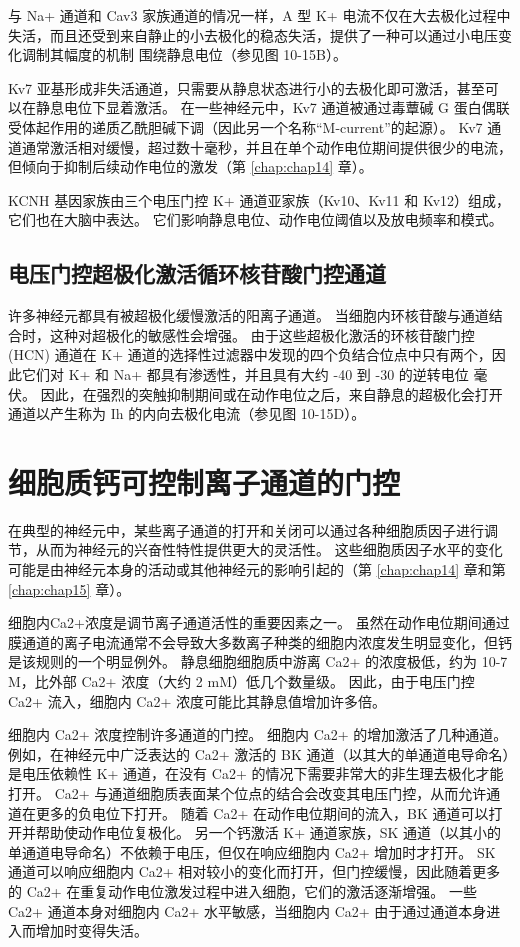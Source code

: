 与 Na+ 通道和 Cav3 家族通道的情况一样，A 型 K+ 电流不仅在大去极化过程中失活，而且还受到来自静止的小去极化的稳态失活，提供了一种可以通过小电压变化调制其幅度的机制 围绕静息电位（参见图 10-15B）。

Kv7 亚基形成非失活通道，只需要从静息状态进行小的去极化即可激活，甚至可以在静息电位下显着激活。 
在一些神经元中，Kv7 通道被通过毒蕈碱 G 蛋白偶联受体起作用的递质乙酰胆碱下调（因此另一个名称“M-current”的起源）。 
Kv7 通道通常激活相对缓慢，超过数十毫秒，并且在单个动作电位期间提供很少的电流，但倾向于抑制后续动作电位的激发（第 \ref{chap:chap14} 章）。

KCNH 基因家族由三个电压门控 K+ 通道亚家族（Kv10、Kv11 和 Kv12）组成，它们也在大脑中表达。 
它们影响静息电位、动作电位阈值以及放电频率和模式。


\subsection{电压门控超极化激活循环核苷酸门控通道}
许多神经元都具有被超极化缓慢激活的阳离子通道。 
当细胞内环核苷酸与通道结合时，这种对超极化的敏感性会增强。 
由于这些超极化激活的环核苷酸门控 (HCN) 通道在 K+ 通道的选择性过滤器中发现的四个负结合位点中只有两个，因此它们对 K+ 和 Na+ 都具有渗透性，并且具有大约 -40 到 -30 的逆转电位 毫伏。 
因此，在强烈的突触抑制期间或在动作电位之后，来自静息的超极化会打开通道以产生称为 Ih 的内向去极化电流（参见图 10-15D）。


\section{细胞质钙可控制离子通道的门控}
在典型的神经元中，某些离子通道的打开和关闭可以通过各种细胞质因子进行调节，从而为神经元的兴奋性特性提供更大的灵活性。 
这些细胞质因子水平的变化可能是由神经元本身的活动或其他神经元的影响引起的（第 \ref{chap:chap14} 章和第 \ref{chap:chap15} 章）。


细胞内Ca2+浓度是调节离子通道活性的重要因素之一。 
虽然在动作电位期间通过膜通道的离子电流通常不会导致大多数离子种类的细胞内浓度发生明显变化，但钙是该规则的一个明显例外。 
静息细胞细胞质中游离 Ca2+ 的浓度极低，约为 10-7 M，比外部 Ca2+ 浓度（大约 2 mM）低几个数量级。 
因此，由于电压门控 Ca2+ 流入，细胞内 Ca2+ 浓度可能比其静息值增加许多倍。


细胞内 Ca2+ 浓度控制许多通道的门控。 
细胞内 Ca2+ 的增加激活了几种通道。 
例如，在神经元中广泛表达的 Ca2+ 激活的 BK 通道（以其大的单通道电导命名）是电压依赖性 K+ 通道，在没有 Ca2+ 的情况下需要非常大的非生理去极化才能打开。 
Ca2+ 与通道细胞质表面某个位点的结合会改变其电压门控，从而允许通道在更多的负电位下打开。 
随着 Ca2+ 在动作电位期间的流入，BK 通道可以打开并帮助使动作电位复极化。 
另一个钙激活 K+ 通道家族，SK 通道（以其小的单通道电导命名）不依赖于电压，但仅在响应细胞内 Ca2+ 增加时才打开。 
SK 通道可以响应细胞内 Ca2+ 相对较小的变化而打开，但门控缓慢，因此随着更多的 Ca2+ 在重复动作电位激发过程中进入细胞，它们的激活逐渐增强。 
一些 Ca2+ 通道本身对细胞内 Ca2+ 水平敏感，当细胞内 Ca2+ 由于通过通道本身进入而增加时变得失活。


